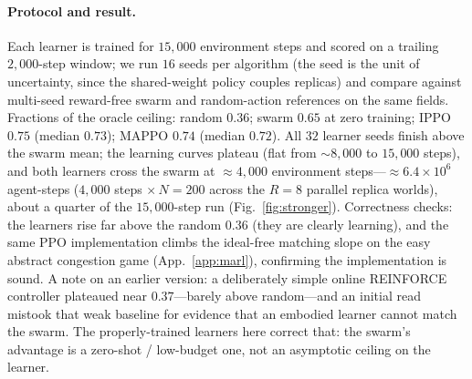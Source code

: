 \documentclass{article}
\newif\ifanon
\begin{document}
\paragraph{Protocol and result.} Each learner is trained for $15{,}000$ environment steps and scored on a
trailing $2{,}000$-step window; we run $16$ seeds per algorithm (the seed is the unit of uncertainty, since the
shared-weight policy couples replicas) and compare against multi-seed reward-free swarm and random-action
references on the same fields. Fractions of the oracle ceiling: random $0.36$; swarm $0.65$ at zero training;
IPPO $0.75$ (median $0.73$); MAPPO $0.74$ (median $0.72$). All $32$ learner seeds finish above the swarm mean;
the learning curves plateau (flat from ${\sim}8{,}000$ to $15{,}000$ steps), and both learners cross the swarm
at ${\approx}4{,}000$ environment steps---${\approx}6.4\times10^{6}$ agent-steps ($4{,}000$ steps $\times\,N{=}200$
across the $R{=}8$ parallel replica worlds), about a quarter of the $15{,}000$-step run (Fig.~\ref{fig:stronger}). Correctness checks: the learners rise far above the random
$0.36$ (they are clearly learning), and the same PPO implementation climbs the ideal-free matching slope on the
easy abstract congestion game (App.~\ref{app:marl}), confirming the implementation is sound. A note on an
earlier version: a deliberately simple online REINFORCE controller plateaued near $0.37$---barely above
random---and an initial read mistook that weak baseline for evidence that an embodied learner cannot match the
swarm. The properly-trained learners here correct that: the swarm's advantage is a zero-shot / low-budget one,
not an asymptotic ceiling on the learner.


\ifanon  \else  \fi
\end{document}
